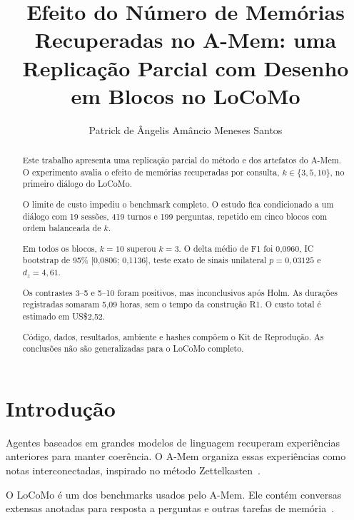 \documentclass[sigconf]{acmart}
\begin{document}
\renewcommand{\keywordsname}{PALAVRAS-CHAVE}

\title{Efeito do Número de Memórias Recuperadas no A-Mem: uma Replicação Parcial com Desenho em Blocos no LoCoMo}

\author{Patrick de \^{A}ngelis Am\^{a}ncio Meneses Santos}

\begin{abstract}
Este trabalho apresenta uma replicação parcial do método e dos artefatos do A-Mem. O experimento avalia o efeito de memórias recuperadas por consulta, \(k\in\{3,5,10\}\), no primeiro diálogo do LoCoMo.

O limite de custo impediu o benchmark completo. O estudo fica condicionado a um diálogo com 19 sessões, 419 turnos e 199 perguntas, repetido em cinco blocos com ordem balanceada de \(k\).

Em todos os blocos, \(k=10\) superou \(k=3\). O delta médio de F1 foi 0,0960, IC bootstrap de 95\% [0,0806; 0,1136], teste exato de sinais unilateral \(p=0,03125\) e \(d_z=4,61\).

Os contrastes 3--5 e 5--10 foram positivos, mas inconclusivos após Holm. As durações registradas somaram 5,09 horas, sem o tempo da construção R1. O custo total é estimado em US\$2,52.

Código, dados, resultados, ambiente e hashes compõem o Kit de Reprodução. As conclusões não são generalizadas para o LoCoMo completo.
\end{abstract}


\maketitle

\section{Introdução}

Agentes baseados em grandes modelos de linguagem recuperam experiências anteriores para manter coerência. O A-Mem organiza essas experiências como notas interconectadas, inspirado no método Zettelkasten~\cite{xu2025amem}.

O LoCoMo é um dos benchmarks usados pelo A-Mem. Ele contém conversas extensas anotadas para resposta a perguntas e outras tarefas de memória~\cite{maharana2024locomo}.
\end{document}
